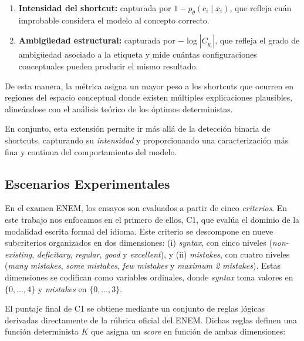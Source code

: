 \documentclass[12pt]{article}
\begin{document}
\begin{enumerate}
\item \textbf{Intensidad del shortcut:} capturada por $1 - p_\theta(c_i \mid x_i)$, que refleja cuán improbable considera el modelo al concepto correcto.
\item \textbf{Ambigüedad estructural:} capturada por $-\log |C_{y_i}|$, que refleja el grado de ambigüedad asociado a la etiqueta y mide cuántas configuraciones conceptuales pueden producir el mismo resultado.
\end{enumerate}

De esta manera, la métrica asigna un mayor peso a los shortcuts que ocurren en regiones del espacio conceptual donde existen múltiples explicaciones plausibles, alineándose con el análisis teórico de los óptimos deterministas.

En conjunto, esta extensión permite ir más allá de la detección binaria de shortcuts, capturando su \textit{intensidad} y proporcionando una caracterización más fina y continua del comportamiento del modelo.

\subsection{Escenarios Experimentales}

En el examen ENEM, los ensayos son evaluados a partir de cinco \textit{criterios}. En este trabajo nos enfocamos en el primero de ellos, C1, que evalúa el dominio de la modalidad escrita formal del idioma. Este criterio se descompone en nueve subcriterios organizados en dos dimensiones: (i) \textit{syntax}, con cinco niveles (\textit{non-existing}, \textit{deficitary}, \textit{regular}, \textit{good} y \textit{excellent}), y (ii) \textit{mistakes}, con cuatro niveles (\textit{many mistakes}, \textit{some mistakes}, \textit{few mistakes} y \textit{maximum 2 mistakes}). Estas dimensiones se codifican como variables ordinales, donde \textit{syntax} toma valores en $\{0, \dots, 4\}$ y \textit{mistakes} en $\{0, \dots, 3\}$.

El puntaje final de C1 se obtiene mediante un conjunto de reglas lógicas derivadas directamente de la rúbrica oficial del ENEM. Dichas reglas definen una función determinista $K$ que asigna un \textit{score} en función de ambas dimensiones:
\end{document}
